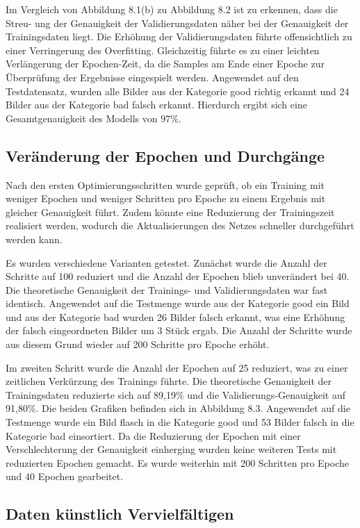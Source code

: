Im Vergleich von Abbildung 8.1(b) zu Abbildung 8.2 ist zu erkennen, dass die Streu-
ung der Genauigkeit der Validierungsdaten näher bei der Genauigkeit der Trainingsdaten
liegt. Die Erhöhung der Validierungsdaten führte offensichtlich zu einer Verringerung des
Overfitting. Gleichzeitig führte es zu einer leichten Verlängerung der Epochen-Zeit, da
die Samples am Ende einer Epoche zur Überprüfung der Ergebnisse eingespielt werden.
Angewendet auf den Testdatensatz, wurden alle Bilder aus der Kategorie good richtig
erkannt und 24 Bilder aus der Kategorie bad falsch erkannt. Hierdurch ergibt sich eine
Gesamtgenauigkeit des Modells von 97\%.

\subsection{Veränderung der Epochen und Durchgänge}

Nach den ersten Optimierungsschritten wurde geprüft, ob ein Training mit weniger 
Epochen und weniger Schritten pro Epoche zu einem Ergebnis mit gleicher Genauigkeit führt.
Zudem könnte eine Reduzierung der Trainingszeit realisiert werden, wodurch die 
Aktualisierungen des Netzes schneller durchgeführt werden kann.

Es wurden verschiedene Varianten getestet. Zunächst wurde die Anzahl der Schritte auf
100 reduziert und die Anzahl der Epochen blieb unverändert bei 40. Die theoretische 
Genauigkeit der Trainings- und Validierungsdaten war fast identisch. Angewendet auf die
Testmenge wurde aus der Kategorie good ein Bild und aus der Kategorie bad wurden 26
Bilder falsch erkannt, was eine Erhöhung der falsch eingeordneten Bilder um 3 Stück 
ergab. Die Anzahl der Schritte wurde aus diesem Grund wieder auf 200 Schritte pro Epoche
erhöht.

Im zweiten Schritt wurde die Anzahl der Epochen auf 25 reduziert, was zu einer zeitlichen
Verkürzung des Trainings führte. Die theoretische Genauigkeit der Trainingsdaten 
reduzierte sich auf 89,19\% und die Validierungs-Genauigkeit auf 91,80\%. Die beiden Grafiken
befinden sich in Abbildung 8.3. Angewendet auf die Testmenge wurde ein Bild flasch in
die Kategorie good und 53 Bilder falsch in die Kategorie bad einsortiert. Da die 
Reduzierung der Epochen mit einer Verschlechterung der Genauigkeit einherging wurden keine
weiteren Tests mit reduzierten Epochen gemacht. Es wurde weiterhin mit 200 Schritten
pro Epoche und 40 Epochen gearbeitet.

\subsection{Daten künstlich Vervielfältigen}

